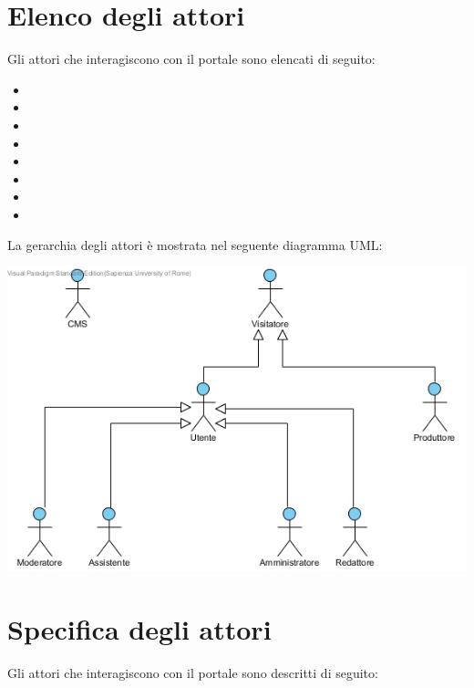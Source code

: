 \section{Elenco degli attori}
Gli attori che interagiscono con il portale sono elencati di seguito:
\begin{itemize}
	\item {}
	\item {}
	\item {}
	\item {}
	\item {}
	\item {}
	\item {}
	\item {}
\end{itemize}
La gerarchia degli attori è mostrata nel seguente diagramma UML:
\begin{center}
   \includegraphics[width=\textwidth]{assets/visualParadigm/SchemaAttori}
\end{center}

\section{Specifica degli attori}
Gli attori che interagiscono con il portale sono descritti di seguito:

